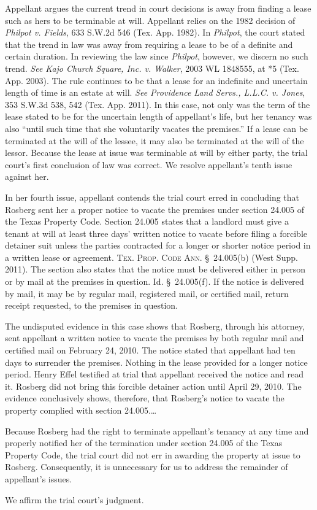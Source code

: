 Appellant argues the current trend in court decisions is away from finding a
lease such as hers to be terminable at will. Appellant relies on the 1982
decision of \textit{Philpot v. Fields}, 633 S.W.2d 546 (Tex. App. 1982). In
\textit{Philpot}, the court stated that the trend in law was away from
requiring a lease to be of a definite and certain duration. In reviewing the
law since \textit{Philpot}, however, we discern no such trend. \textit{See Kajo
Church Square, Inc. v. Walker}, 2003 WL 1848555, at *5 (Tex. App. 2003). The
rule continues to be that a lease for an indefinite and uncertain length of
time is an estate at will. \textit{See Providence Land Servs., L.L.C. v.
Jones}, 353 S.W.3d 538, 542 (Tex. App. 2011). In this case, not only was the
term of the lease stated to be for the uncertain length of appellant's life,
but her tenancy was also ``until such time that she voluntarily vacates the
premises.'' If a lease can be terminated at the will of the lessee, it may also
be terminated at the will of the lessor. Because the lease at issue was
terminable at will by either party, the trial court's first conclusion of law
was correct. We resolve appellant's tenth issue against her.

In her fourth issue, appellant contends the trial court erred in concluding that
Rosberg sent her a proper notice to vacate the premises under section 24.005 of
the Texas Property Code. Section 24.005 states that a landlord must give a
tenant at will at least three days' written notice to vacate before filing a
forcible detainer suit unless the parties contracted for a longer or shorter
notice period in a written lease or agreement. \textsc{Tex. Prop. Code Ann}.
\S~24.005(b) (West Supp. 2011). The section also states that the notice must
be delivered either in person or by mail at the premises in question. Id.
\S~24.005(f). If the notice is delivered by mail, it may be by regular mail,
registered mail, or certified mail, return receipt requested, to the premises
in question. 

The undisputed evidence in this case shows that Rosberg, through his attorney,
sent appellant a written notice to vacate the premises by both regular mail and
certified mail on February 24, 2010. The notice stated that appellant had ten
days to surrender the premises. Nothing in the lease provided for a longer
notice period. Henry Effel testified at trial that appellant received the
notice and read it. Rosberg did not bring this forcible detainer action until
April 29, 2010. The evidence conclusively shows, therefore, that Rosberg's
notice to vacate the property complied with section 24.005.\ldots

Because Rosberg had the right to terminate appellant's tenancy at any time and
properly notified her of the termination under section 24.005 of the Texas
Property Code, the trial court did not err in awarding the property at issue to
Rosberg. Consequently, it is unnecessary for us to address the remainder of
appellant's issues.  

We affirm the trial court's judgment.

